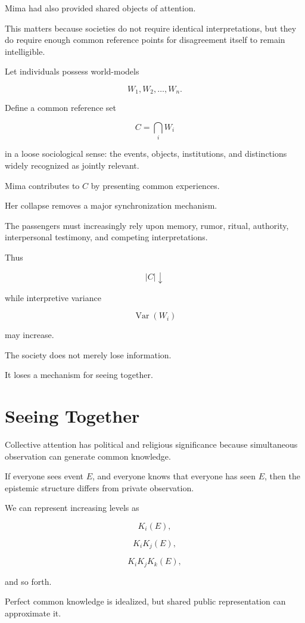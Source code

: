 \documentclass[11pt,oneside]{book}
\theoremstyle{definition}
\theoremstyle{remark}
\begin{document}
Mima had also provided shared objects of attention.

This matters because societies do not require identical interpretations, but they do require enough common reference points for disagreement itself to remain intelligible.

Let individuals possess world-models

\[
W_1,W_2,\ldots,W_n.
\]

Define a common reference set

\[
C
=
\bigcap_i W_i
\]

in a loose sociological sense: the events, objects, institutions, and distinctions widely recognized as jointly relevant.

Mima contributes to \(C\) by presenting common experiences.

Her collapse removes a major synchronization mechanism.

The passengers must increasingly rely upon memory, rumor, ritual, authority, interpersonal testimony, and competing interpretations.

Thus

\[
|C|\downarrow
\]

while interpretive variance

\[
\operatorname{Var}(W_i)
\]

may increase.

The society does not merely lose information.

It loses a mechanism for seeing together.

\section{Seeing Together}

Collective attention has political and religious significance because simultaneous observation can generate common knowledge.

If everyone sees event \(E\), and everyone knows that everyone has seen \(E\), then the epistemic structure differs from private observation.

We can represent increasing levels as

\[
K_i(E),
\]

\[
K_iK_j(E),
\]

\[
K_iK_jK_k(E),
\]

and so forth.

Perfect common knowledge is idealized, but shared public representation can approximate it.
\end{document}
